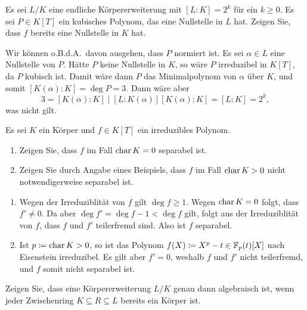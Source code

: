 \begin{question}
  Es sei $L/K$ eine endliche Körpererweiterung mit $[L : K] = 2^k$ für ein $k \geq 0$.
  Es sei $P \in K[T]$ ein kubisches Polynom, das eine Nullstelle in $L$ hat.
  Zeigen Sie, dass $f$ bereits eine Nullstelle in $K$ hat.
\end{question}


\begin{solution}
  Wir können o.B.d.A.\ davon ausgehen, dass $P$ normiert ist.
  Es sei $\alpha \in L$ eine Nullstelle von $P$.
  Hätte $P$ keine Nullstelle in $K$, so wäre $P$ irreduzibel in $K[T]$, da $P$ kubisch ist.
  Damit wäre dann $P$ das Minimalpolynom von $\alpha$ über $K$, und somit $[K(\alpha) : K] = \deg P = 3$.
  Dann wäre aber
  \[
          3
    =     [K(\alpha) : K]
    \mid  [L : K(\alpha)] [K(\alpha) : K]
    =     [L : K]
    =     2^k,
  \]
  was nicht gilt.
\end{solution}


\begin{question}
  Es sei $K$ ein Körper und $f \in K[T]$ ein irreduzibles Polynom.
  \begin{enumerate}
    \item
      Zeigen Sie, dass $f$ im Fall $\operatorname{char} K = 0$ separabel ist.
    \item
      Zeigen Sie durch Angabe eines Beispiels, dass $f$ im Fall $\operatorname{char} K > 0$ nicht notwendigerweise separabel ist.
  \end{enumerate}
\end{question}


\begin{enumerate}
  \item
    Wegen der Irreduziblität von $f$ gilt $\deg f \geq 1$.
    Wegen $\operatorname{char} K = 0$ folgt, dass $f' \neq 0$.
    Da aber $\deg f' = \deg f - 1 < \deg f$ gilt, folgt aus der Irreduziblität von $f$, dass $f$ und $f'$ teilerfremd sind.
    Also ist $f$ separabel.
  \item
    Ist $p \coloneqq \operatorname{char} K > 0$, so ist das Polynom $f(X) \coloneqq X^p - t \in \mathbb{F}_p(t)[X]$ nach Eisenstein irreduzibel.
    Es gilt aber $f' = 0$, weshalb $f$ und $f'$ nicht teilerfremd, und $f$ somit nicht separabel ist.
\end{enumerate}


\begin{question}
  Zeigen Sie, dass eine Körpererweiterung $L/K$ genau dann algebraisch ist, wenn jeder Zwischenring $K \subseteq R \subseteq L$ bereits ein Körper ist.
\end{question}


